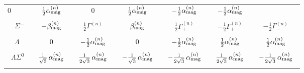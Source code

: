 \documentclass[preprintnumbers,prd,superscriptaddress,preprint]{revtex4-1}
\begin{document}
\begin{table}[t]
\begin{center}
\begin{tabular}{l|cc|cc|cc}
$0$ &
$\frac12 \alpha_{\rm mag}^{(n)}$ &
$0$ &
$\frac12 \alpha_{\rm mag}^{(n)}$ &
$-\frac12 \alpha_{\rm mag}^{(n)}$ &
$-\frac12 \alpha_{\rm mag}^{(n)}$ 
\\
& & & & &
\\
~~$\Sigma^-$ &
$-\beta_{\rm mag}^{(n)}$ &
$\frac12 \Gamma_-^{(n)}$ &
$\beta_{\rm mag}^{(n)}$ &
$\frac12 \Gamma_+^{(n)}$ & 
$-\frac12 \Gamma_+^{(n)}$ & 
$-\frac12 \Gamma_-^{(n)}$  
\\
& & & & &
\\
~~$\Lambda$ & 
$0$ &
$-\frac12 \alpha_{\rm mag}^{(n)}$ &
$0$ &
$-\frac12 \alpha_{\rm mag}^{(n)}$ &
$\frac12 \alpha_{\rm mag}^{(n)}$ &
$\frac12 \alpha_{\rm mag}^{(n)}$ 
\\
& & & & &
\\
~$\Lambda\Sigma^0$~ &
~$\frac{1}{\sqrt3}\, \alpha_{\rm mag}^{(n)}$~ &
~$\frac{1}{2\sqrt3}\, \alpha_{\rm mag}^{(n)}$~ &
~$-\frac{1}{\sqrt3}\, \alpha_{\rm mag}^{(n)}$~ &
~$-\frac{1}{2\sqrt3}\, \alpha_{\rm mag}^{(n)}$~ &
~$\frac{1}{2\sqrt3}\, \alpha_{\rm mag}^{(n)}$~ &
~$-\frac{1}{2\sqrt3}\, \alpha_{\rm mag}^{(n)}$~
\\ 
& & & & &
\\ \hline
\end{tabular}
\label{tab:tad}
\end{center}
\end{table}
\end{document}
